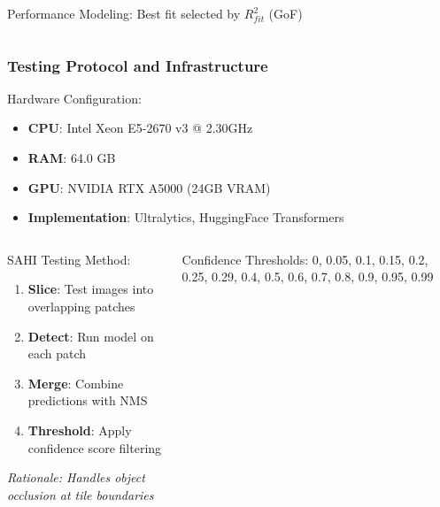 \documentclass[aspectratio=43]{beamer}
\begin{document}
\begin{frame}
\begin{columns}
\begin{column}{0.5\textwidth}
\begin{exampleblock}{Performance Modeling:}
                Best fit selected by $R^2_{fit}$ (GoF)
            \end{exampleblock}
        \end{column}
    \end{columns}
\end{frame}

\begin{frame}
    \frametitle{Testing Protocol and Infrastructure}
    
    \begin{block}{Hardware Configuration:}
        \small
        \begin{itemize}
            \item \textbf{CPU}: Intel Xeon E5-2670 v3 @ 2.30GHz
            \item \textbf{RAM}: 64.0 GB
            \item \textbf{GPU}: NVIDIA RTX A5000 (24GB VRAM)
            \item \textbf{Implementation}: Ultralytics, HuggingFace Transformers
        \end{itemize}
    \end{block}
    
    \begin{columns}
        \begin{column}{0.6\textwidth}
            \begin{block}{SAHI Testing Method:}
                \small
                \begin{enumerate}
                    \item \textbf{Slice}: Test images into overlapping patches
                    \item \textbf{Detect}: Run model on each patch
                    \item \textbf{Merge}: Combine predictions with NMS
                    \item \textbf{Threshold}: Apply confidence score filtering
                \end{enumerate}
                
                \textit{Rationale: Handles object occlusion at tile boundaries}
            \end{block}
        \end{column}
        
        \begin{column}{0.4\textwidth}
            \begin{exampleblock}{Confidence Thresholds:}
                \scriptsize
                0, 0.05, 0.1, 0.15, 0.2, 0.25, 0.29, 0.4, 0.5, 0.6, 0.7, 0.8, 0.9, 0.95, 0.99
                

\end{exampleblock}
\end{column}
\end{columns}
\end{frame}
\end{document}
